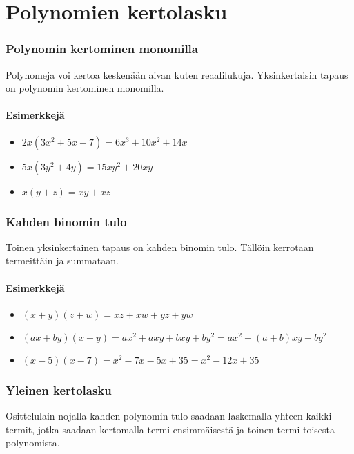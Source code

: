 \chapter{Polynomien kertolasku}

\subsection*{Polynomin kertominen monomilla}

Polynomeja voi kertoa keskenään aivan kuten reaalilukuja. Yksinkertaisin tapaus on polynomin kertominen monomilla.

\subsubsection*{Esimerkkejä}
\begin{itemize}
    \item $2x(3x^2+5x+7) = 6x^3+10x^2+14x$
    \item $5x(3y^2+4y) = 15xy^2+20xy$
    \item $x(y+z) = xy+xz$
\end{itemize}

\subsection*{Kahden binomin tulo}

Toinen yksinkertainen tapaus on kahden binomin tulo. Tällöin kerrotaan termeittäin ja summataan.

\subsubsection*{Esimerkkejä}
\begin{itemize}
    \item $(x+y)(z+w) = xz+xw+yz+yw$
    \item $(ax+by)(x+y) = ax^2+axy+bxy+by^2 = ax^2+(a+b)xy+by^2$
    \item $(x-5)(x-7) = x^2-7x-5x+35 = x^2-12x+35$
\end{itemize}

\subsection*{Yleinen kertolasku}

Osittelulain nojalla kahden polynomin tulo saadaan laskemalla yhteen kaikki
termit, jotka saadaan kertomalla termi ensimmäisestä ja toinen termi toisesta
polynomista.

